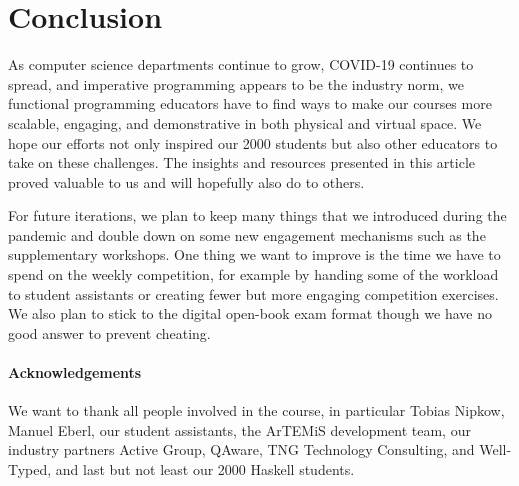 \section{Conclusion}\label{sec:conclusion}

As computer science departments continue to grow,
COVID-19 continues to spread,
and imperative programming appears to be the industry norm,
we functional programming educators
have to find ways to make our courses more scalable,
engaging, and demonstrative in both physical and virtual space.
We hope our efforts not only inspired our 2000 students
but also other educators to take on these challenges.
The insights and resources presented in this article proved valuable to us and will hopefully also do to others.

For future iterations,
we plan to keep many things that we introduced during the pandemic and double down on some new engagement mechanisms such as the supplementary workshops.
One thing we want to improve is the
time we have to spend on the weekly competition,
for example by handing some of the workload to student assistants or creating fewer but more engaging competition exercises.
We also plan to stick to the digital open-book exam format
though we have no good answer to prevent cheating.

\paragraph{Acknowledgements}
We want to thank all people involved in the course,
in particular Tobias Nipkow,
Manuel Eberl,
our student assistants,
the ArTEMiS development team,
our industry partners
Active Group,
QAware,
TNG Technology Consulting,
and Well-Typed,
and last but not least our 2000 Haskell students.

